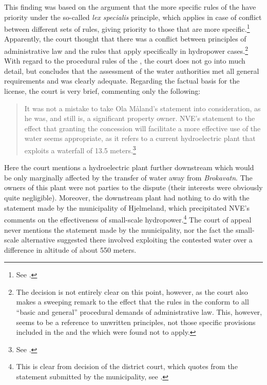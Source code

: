 This finding was based on the argument that the more specific rules of the \cite{wra17} have priority under the so-called {\it lex specialis} principle, which applies in case of conflict between different sets of rules, giving priority to those that are more specific.\footnote{See \cite[7]{jorpeland11a}.} Apparently, the court thought that there was a conflict between principles of administrative law and the rules that apply specifically in hydropower cases.\footnote{The decision is not entirely clear on this point, however, as the court also makes a sweeping remark to the effect that the rules in the \cite{wra17} conform to all ``basic and general'' procedural demands of administrative law. This, however, seems to be a reference to unwritten principles, not those specific provisions included in the \cite{paa67} and the \cite{ea59} which were found not to apply.} With regard to the procedural rules of the \cite{wra17}, the court does not go into much detail, but concludes that the assessment of the water authorities met all general requirements and was clearly adequate. Regarding the factual basis for the license, the court is very brief, commenting only the following:

\begin{quote} It was not a mistake to take Ola Måland's statement into consideration, as he was, and still is, a significant property owner. NVE's statement to the effect that granting the concession will facilitate a more effective use of the water seems appropriate, as it refers to a current hydroelectric plant that exploits a waterfall of 13.5 meters.\footnote{See \cite[8]{jorpeland11a}.}
\end{quote}

Here the court mentions a hydroelectric plant further downstream which would be only marginally affected by the transfer of water away from {\it Brokavatn}. The owners of this plant were not parties to the dispute (their interests were obviously quite negligible). Moreover, the downstream plant had nothing to do with the statement made by the municipality of Hjelmeland, which precipitated NVE's comments on the effectiveness of small-scale hydropower.\footnote{This is clear from decision of the  district court, which quotes from the statement submitted by the municipality, see \cite[16]{jorpeland09}.} The court of appeal never mentions the statement made by the municipality, nor the fact the small-scale alternative suggested there involved exploiting the contested water over a difference in altitude of about 550 meters.

